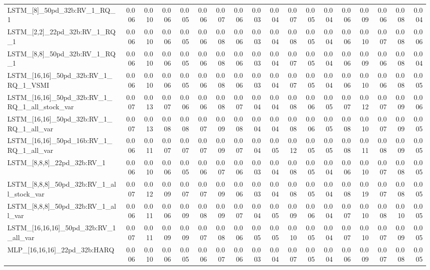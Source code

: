 \begin{tabular}{lrrrrrrrrrrrrrrrrr}
LSTM\_[8]\_50pd\_32b:RV\_1\_RQ\_1 & 0.006 & 0.010 & 0.006 & 0.005 & 0.006 & 0.007 & 0.006 & 0.003 & 0.004 & 0.007 & 0.005 & 0.004 & 0.006 & 0.009 & 0.006 & 0.008 & 0.004 \\
LSTM\_[2,2]\_22pd\_32b:RV\_1\_RQ\_1 & 0.006 & 0.010 & 0.006 & 0.005 & 0.006 & 0.008 & 0.006 & 0.003 & 0.004 & 0.008 & 0.005 & 0.004 & 0.006 & 0.010 & 0.007 & 0.008 & 0.006 \\
LSTM\_[8,8]\_50pd\_32b:RV\_1\_RQ\_1 & 0.006 & 0.010 & 0.006 & 0.005 & 0.006 & 0.008 & 0.006 & 0.003 & 0.004 & 0.007 & 0.005 & 0.004 & 0.006 & 0.009 & 0.006 & 0.008 & 0.004 \\
LSTM\_[16,16]\_50pd\_32b:RV\_1\_RQ\_1\_VSMI & 0.006 & 0.010 & 0.006 & 0.005 & 0.006 & 0.008 & 0.006 & 0.003 & 0.004 & 0.007 & 0.005 & 0.004 & 0.006 & 0.010 & 0.006 & 0.008 & 0.005 \\
LSTM\_[16,16]\_50pd\_32b:RV\_1\_RQ\_1\_all\_stock\_var & 0.007 & 0.013 & 0.007 & 0.006 & 0.006 & 0.008 & 0.007 & 0.004 & 0.004 & 0.008 & 0.006 & 0.005 & 0.007 & 0.012 & 0.007 & 0.009 & 0.006 \\
LSTM\_[16,16]\_50pd\_32b:RV\_1\_RQ\_1\_all\_var & 0.007 & 0.013 & 0.008 & 0.008 & 0.007 & 0.009 & 0.008 & 0.004 & 0.004 & 0.008 & 0.006 & 0.005 & 0.008 & 0.010 & 0.007 & 0.009 & 0.005 \\
LSTM\_[16,16]\_50pd\_16b:RV\_1\_RQ\_1\_all\_var & 0.006 & 0.011 & 0.007 & 0.007 & 0.007 & 0.009 & 0.007 & 0.004 & 0.005 & 0.012 & 0.005 & 0.005 & 0.008 & 0.011 & 0.008 & 0.009 & 0.005 \\
LSTM\_[8,8,8]\_22pd\_32b:RV\_1 & 0.006 & 0.010 & 0.006 & 0.005 & 0.006 & 0.007 & 0.006 & 0.003 & 0.004 & 0.008 & 0.005 & 0.004 & 0.006 & 0.010 & 0.007 & 0.008 & 0.005 \\
LSTM\_[8,8,8]\_50pd\_32b:RV\_1\_all\_stock\_var & 0.007 & 0.012 & 0.009 & 0.007 & 0.007 & 0.009 & 0.006 & 0.003 & 0.004 & 0.008 & 0.005 & 0.004 & 0.008 & 0.019 & 0.007 & 0.008 & 0.005 \\
LSTM\_[8,8,8]\_50pd\_32b:RV\_1\_all\_var & 0.006 & 0.011 & 0.006 & 0.009 & 0.008 & 0.009 & 0.007 & 0.004 & 0.005 & 0.009 & 0.006 & 0.004 & 0.007 & 0.010 & 0.008 & 0.010 & 0.005 \\
LSTM\_[16,16,16]\_50pd\_32b:RV\_1\_all\_var & 0.007 & 0.011 & 0.009 & 0.009 & 0.007 & 0.008 & 0.006 & 0.005 & 0.005 & 0.010 & 0.005 & 0.004 & 0.007 & 0.010 & 0.007 & 0.009 & 0.005 \\
MLP\_[16,16,16]\_22pd\_32b:HARQ & 0.006 & 0.010 & 0.006 & 0.005 & 0.006 & 0.007 & 0.006 & 0.003 & 0.004 & 0.007 & 0.005 & 0.004 & 0.006 & 0.009 & 0.007 & 0.008 & 0.005 \\

\end{tabular}
